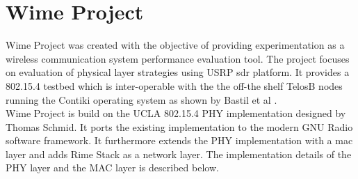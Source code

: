 \section{Wime Project}
Wime Project \cite{noauthor_wime_nodate} was created with the objective of providing experimentation as a wireless communication system performance evaluation tool.
The project focuses on evaluation of physical layer strategies using USRP \ac{sdr} platform.
It provides a 802.15.4 testbed which is inter-operable with the the off-the shelf TelosB nodes running the Contiki operating system as shown by Bastil et al \cite{bloessl_towards_2013}.\\

Wime Project is build on the UCLA 802.15.4 PHY implementation \cite{ucla_phy} designed  by Thomas Schmid.
It ports the existing implementation to the modern GNU Radio software framework.
It furthermore extends the PHY implementation with a \ac{mac} layer and adds Rime Stack as a network layer.
The implementation details of the PHY layer and the MAC layer is described below.\\

